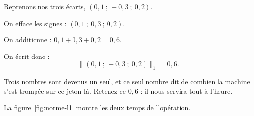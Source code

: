 \begin{exemple}
Reprenons nos trois écarts, $(0{,}1 \ ; \ -0{,}3 \ ; \ 0{,}2)$.

On efface les signes : $(0{,}1 \ ; \ 0{,}3 \ ; \ 0{,}2)$.

On additionne : $0{,}1 + 0{,}3 + 0{,}2 = 0{,}6$.

On écrit donc :
\[
  \bigl\| (0{,}1 \ ; \ -0{,}3 \ ; \ 0{,}2) \bigr\|_{1} = 0{,}6 .
\]

Trois nombres sont devenus un seul, et ce seul nombre dit de combien la
machine s'est trompée sur ce jeton-là. Retenez ce $0{,}6$ : il nous servira
tout à l'heure.
\end{exemple}

La figure~\ref{fig:norme-l1} montre les deux temps de l'opération.


